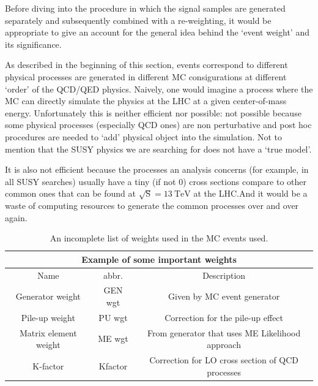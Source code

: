 Before diving into the procedure in which the signal samples are generated separately and
subsequently combined with a re-weighting, it would be appropriate to give
an account for the general idea behind the `event weight' and its significance.

As described in the beginning of this section, events correspond to different physical
processes are generated in different MC consigurations at different `order' of the QCD/QED physics.
Naively, one would imagine a process where the MC can directly simulate the physics at
the LHC at a given center-of-mass energy. Unfortunately this is neither efficient nor possible:
not possible because some physical processes (especially QCD ones) are non perturbative and
post hoc procedures are needed to `add' physical object into the simulation. Not to mention
that the SUSY physics we are searching for does not have a `true model'.

It is also not efficient because the processes an analysis concerns (for example, in all SUSY
searches) usually have a tiny (if not 0) cross sections compare to other common ones that can be
found at
$\sqrt{\mathrm{S}} = \SI{13}{\tera\electronvolt}$ at the LHC.\@ And it would be a waste of
computing resources to generate the common processes over and over again.

\begin{table}[]
\centering
\begin{tabular}{|c|c|c|}
\hline
\multicolumn{3}{|c|}{Example of some important weights}                                                                                       \\ \hline
Name                  & abbr.   & Description                                                                                                 \\ \hline
Generator weight      & GEN wgt & Given by MC event generator                                                                                 \\ \hline
Pile-up weight        & PU wgt  & Correction for the pile-up effect                                                                           \\ \hline
Matrix element weight & ME wgt  & From generator that uses ME Likelihood approach \\ \hline
K-factor              & Kfactor & Correction for LO cross section of QCD processes                                                         \\ \hline
\end{tabular}
\caption{An incomplete list of weights used in the MC events used.}
\label{tab:MC_wgts}
\end{table}

